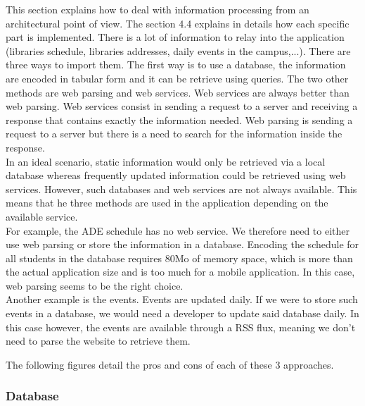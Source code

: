\documentclass{eplmastersthesis}
\begin{document}
This section explains how to deal with information processing from an architectural point of view. The section 4.4 explains in details how each specific part is implemented.
There is a lot of information to relay into the application (libraries schedule, libraries addresses, daily events in the campus,...). There are three ways to import them. The first way is to use a database, the information are encoded in tabular form and it can be retrieve using queries. The two other methods are web parsing and web services. Web services are always better than web parsing. Web services consist in sending a request to a server and receiving a response that contains exactly the information needed. Web parsing is sending a request to a server but there is a need to search for the information inside the response.\\

In an ideal scenario, static information would only be retrieved via a local database whereas frequently updated information could be retrieved using web services. However, such databases and web services are not always available. This means that he three methods are used in the application depending on the available service.
\\ For example, the ADE schedule has no web service. We therefore need to either use web parsing or store the information in a database. Encoding the schedule for all students in the database requires 80Mo of memory space, which is more than the actual application size and is too much for a mobile application. In this case, web parsing seems to be the right choice.\\  Another example is the events. Events are updated daily. If we were to store such events in a database, we would need a developer to update said database daily. In this case however, the events are available through a RSS flux, meaning we don't need to parse the website to retrieve them.

The following figures detail the pros and cons of each of these 3 approaches.

\subsubsection{Database}
\end{document}

